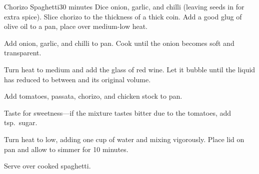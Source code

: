 \begin{recipe}{Chorizo Spaghetti}{30 minutes}{}
Dice onion, garlic, and chilli (leaving seeds in for extra spice). Slice
chorizo to the thickness of a thick coin.
Add a good glug of olive oil to a pan, place over medium-low heat.\newstep

Add onion, garlic, and chilli to pan. Cook until the onion becomes soft and
transparent.

Turn heat to medium and add the glass of red wine. Let it bubble until the
liquid has reduced to between  and  its original volume.

Add tomatoes, passata, chorizo, and chicken stock to pan.\newstep

Taste for sweetness---if the mixture tastes bitter due to the tomatoes, add
 tsp.\ sugar.\newstep

Turn heat to low, adding one cup of water and mixing vigorously. Place lid on
pan and allow to simmer for 10 minutes.\newstep

Serve over cooked spaghetti.

\end{recipe}
